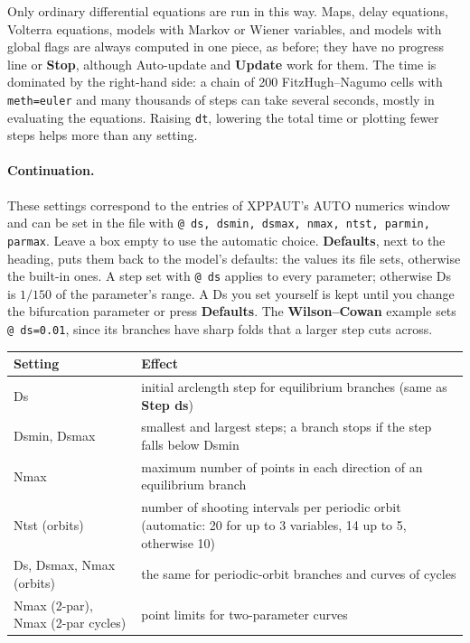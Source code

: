 \documentclass[11pt,a4paper]{article}
\newcommand{\XPP}{\textsf{XPPAUT}}
\newcommand{\ui}[1]{\textsf{\textbf{#1}}}          %
\begin{document}
\begin{notebox}
Only ordinary differential equations are run in this way. Maps, delay equations, Volterra equations, models with Markov or Wiener variables, and models with global flags are always computed in one piece, as before; they have no progress line or \ui{Stop}, although Auto-update and \ui{Update} work for them. The time is dominated by the right-hand side: a chain of 200 FitzHugh--Nagumo cells with \texttt{meth=euler} and many thousands of steps can take several seconds, mostly in evaluating the equations. Raising \texttt{dt}, lowering the total time or plotting fewer steps helps more than any setting.
\end{notebox}

\paragraph{Continuation.} These settings correspond to the entries of \XPP{}'s \textsf{AUTO} numerics window and can be set in the file with \texttt{@ ds, dsmin, dsmax, nmax, ntst, parmin, parmax}. Leave a box empty to use the automatic choice. \ui{Defaults}, next to the heading, puts them back to the model's defaults: the values its file sets, otherwise the built-in ones. A step set with \texttt{@ ds} applies to every parameter; otherwise Ds is $1/150$ of the parameter's range. A Ds you set yourself is kept until you change the bifurcation parameter or press \ui{Defaults}. The \ui{Wilson--Cowan} example sets \texttt{@ ds=0.01}, since its branches have sharp folds that a larger step cuts across.
\begin{center}\small
\begin{tabularx}{0.95\textwidth}{@{}lX@{}}
\toprule
Setting & Effect\\
\midrule
Ds & initial arclength step for equilibrium branches (same as \ui{Step ds})\\
Dsmin, Dsmax & smallest and largest steps; a branch stops if the step falls below Dsmin\\
Nmax & maximum number of points in each direction of an equilibrium branch\\
Ntst (orbits) & number of shooting intervals per periodic orbit (automatic: 20 for up to 3 variables, 14 up to 5, otherwise 10)\\
Ds, Dsmax, Nmax (orbits) & the same for periodic-orbit branches and curves of cycles\\
Nmax (2-par), Nmax (2-par cycles) & point limits for two-parameter curves\\
\bottomrule
\end{tabularx}
\end{center}
\end{document}
